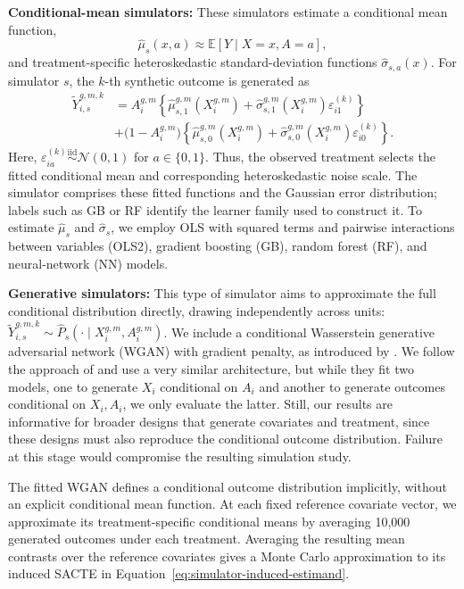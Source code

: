\noindent\textbf{Conditional-mean simulators:}
These simulators estimate a conditional mean function,
\[
\widehat\mu_s(x,a)
\approx
\mathbb E[Y\mid X=x,A=a],
\]
and treatment-specific heteroskedastic standard-deviation functions \(\widehat\sigma_{s,a}(x)\). For simulator \(s\), the \(k\)-th synthetic outcome is generated as
\[
\begin{aligned}
\widetilde Y_{i,s}^{g,m,k}
&= A_i^{g,m}\left\{\widehat\mu_{s,1}^{g,m}(X_i^{g,m})
+ \widehat\sigma_{s,1}^{g,m}(X_i^{g,m})\varepsilon_{i1}^{(k)}\right\} \\[-2pt]
&+ \bigl(1-A_i^{g,m}\bigr)\left\{\widehat\mu_{s,0}^{g,m}(X_i^{g,m})
+ \widehat\sigma_{s,0}^{g,m}(X_i^{g,m})\varepsilon_{i0}^{(k)}\right\}.
\end{aligned}
\]
Here, \(\varepsilon_{ia}^{(k)}\overset{\mathrm{iid}}{\sim}\mathcal N(0,1)\) for \(a\in\{0,1\}\).
Thus, the observed treatment selects the fitted conditional mean and corresponding heteroskedastic noise scale. The simulator comprises these fitted functions and the Gaussian error distribution; labels such as GB or RF identify the learner family used to construct it. To estimate \(\widehat\mu_s\) and \(\widehat\sigma_s\), we employ OLS with squared terms and pairwise interactions between variables (OLS2), gradient boosting (GB), random forest (RF), and neural-network (NN) models.

\noindent\textbf{Generative simulators:}
This type of simulator aims to approximate the full conditional distribution directly, drawing independently across units: \(\widetilde Y_{i,s}^{g,m,k}\sim\widehat P_s(\cdot\mid X_i^{g,m},A_i^{g,m})\). We include a conditional Wasserstein generative adversarial network (WGAN) with gradient penalty, as introduced by . We follow the approach of  and use a very similar architecture, but while they fit two models, one to generate \(X_i\) conditional on \(A_i\) and another to generate outcomes conditional on \(X_i,A_i\), we only evaluate the latter. Still, our results are informative for broader designs that generate covariates and treatment, since these designs must also reproduce the conditional outcome distribution. Failure at this stage would compromise the resulting simulation study.

The fitted WGAN defines a conditional outcome distribution implicitly, without an explicit conditional mean function. At each fixed reference covariate vector, we approximate its treatment-specific conditional means by averaging 10,000 generated outcomes under each treatment. Averaging the resulting mean contrasts over the reference covariates gives a Monte Carlo approximation to its induced SACTE in Equation~\eqref{eq:simulator-induced-estimand}.


